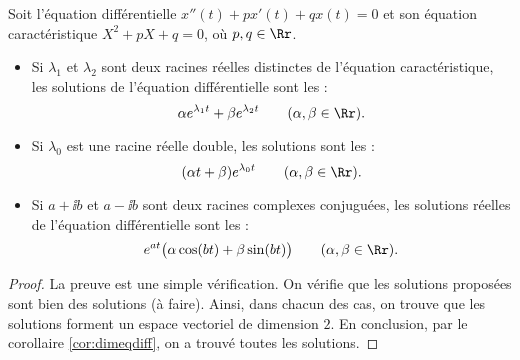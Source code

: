 \documentclass[12pt, class=report,crop=false]{standalone}
\begin{document}
\bigskip

 
\begin{theoreme}
Soit l'équation différentielle $x''(t)+px'(t)+qx(t)=0$
et son équation caractéristique $X^2+pX+q=0$, où $p,q \in \Rr$. 
\begin{itemize}
  \item Si $\lambda_1$ et $\lambda_2$ sont deux racines réelles distinctes de l'équation caractéristique, les solutions de l'équation différentielle sont les :
$$\alpha e^{\lambda_1t} + \beta e^{\lambda_2t} \qquad (\alpha,\beta \in \Rr).$$
  
  \item Si $\lambda_0$ est une racine réelle double, les solutions sont les :
$$(\alpha t + \beta) e^{\lambda_0 t}\qquad (\alpha,\beta \in \Rr).$$

  \item Si $a+\ii b$ et $a-\ii b$ sont deux racines complexes conjuguées, les solutions réelles de l'équation différentielle sont les :
$$e^{at} \big( \alpha \cos (bt) + \beta \sin (bt) \big)\qquad (\alpha,\beta \in \Rr).$$
\end{itemize}
\end{theoreme} 
 
 
  
\begin{proof}
La preuve est une simple vérification. On vérifie que les solutions proposées sont bien des solutions (à faire).
Ainsi, dans chacun des cas, on trouve que les solutions forment un espace vectoriel de dimension $2$.
En conclusion, par le corollaire \ref{cor:dimeqdiff}, on a trouvé toutes les solutions.
\end{proof}

 
\end{document}

